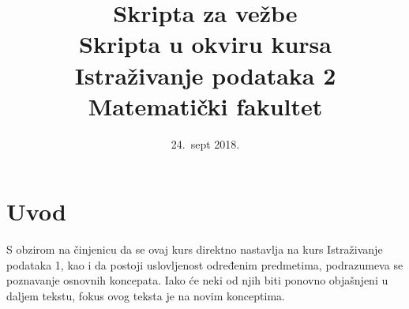 \documentclass[a4paper]{article}
\begin{document}
\title{Skripta za vežbe\\ \small{Skripta u okviru kursa\\Istraživanje podataka 2\\ Matematički fakultet}}

\date{24.~sept 2018.}
\maketitle


\tableofcontents

\newpage

\section{Uvod}
\label{sec:uvod}

S obzirom na činjenicu da se ovaj kurs direktno nastavlja na kurs Istraživanje podataka 1, kao i da postoji uslovljenost određenim predmetima, podrazumeva se poznavanje osnovnih koncepata. Iako će neki od njih biti ponovno objašnjeni u daljem tekstu, fokus ovog teksta je na novim konceptima. 
\end{document}
